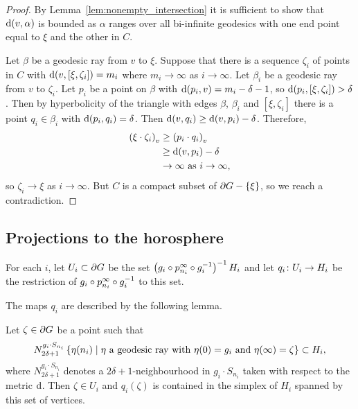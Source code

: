 \documentclass[a4paper]{article}
\begin{document}
\begin{proof}
  By Lemma~\ref{lem:nonempty_intersection} it is sufficient to show that
  $\dist(v, \alpha)$ is bounded as $\alpha$ ranges over all bi-infinite
  geodesics with one end point equal to $\xi$ and the other in $C$.

  Let $\beta$ be a geodesic ray from $v$ to $\xi$. Suppose that there is a
  sequence $\zeta_i$ of points in $C$ with $\dist(v, [\xi, \zeta_i]) = m_i$
  where $m_i \to \infty$ as $i\to \infty$. Let $\beta_i$ be a geodesic ray from
  $v$ to $\zeta_i$. Let $p_i$ be a point on $\beta$ with $\dist(p_i, v) = m_i -
  \delta - 1$, so $\dist(p_i, [\xi, \zeta_i]) > \delta$. Then by hyperbolicity
  of the triangle with edges $\beta$, $\beta_i$ and $[\xi, \zeta_i]$ there is a
  point $q_i \in \beta_i$ with $\dist(p_i, q_i) = \delta$. Then $\dist(v, q_i)
  \geq \dist(v, p_i) - \delta$. Therefore,
  \begin{align*}
    \gromov{v}{\xi}{\zeta_i} &\geq \gromov{v}{p_i}{q_i} \\
                             &\geq \dist(v, p_i) - \delta\\
                             &\to \infty \text{ as $i\to\infty$},
  \end{align*}
  so $\zeta_i\to\xi$ as $i\to\infty$. But $C$ is a compact subset of $\boundary
  G - \set\xi$, so we reach a contradiction.
\end{proof}

\subsection{Projections to the horosphere}

\begin{definition}
  For each $i$, let $U_i \subset \boundary G$ be the set $\left(g_i \composed
  p^\infty_{n_i} \composed g_i^{-1}\right)^{-1} H_i$ and let $q_i \from U_i \to
  H_i$ be the restriction of $g_i \composed p^\infty_{n_i}\composed g_i^{-1}$
  to this set.
\end{definition}

The maps $q_i$ are described by the following lemma.

\begin{lemma}\label{lem:describing_q_i}
  Let $\zeta \in \boundary G$ be a point such that
  \begin{equation*}
    N_{2\delta+1}^{g_i\cdot S_{n_i}} \set{\eta(n_i)\suchthat\text{$\eta$ a geodesic ray with
        $\eta(0) = g_i$ and $\eta(\infty) = \zeta$}} \subset H_i,
  \end{equation*}
  where $N_{2\delta+1}^{g_i\cdot S_{n_i}}$ denotes a $2\delta+1$-neighbourhood
  in $g_i\cdot S_{n_i}$ taken with respect to the metric $\dist$.
  Then $\zeta \in U_i$ and $q_i(\zeta)$ is contained in the simplex of $H_i$
  spanned by this set of vertices.
\end{lemma}
\end{document}
